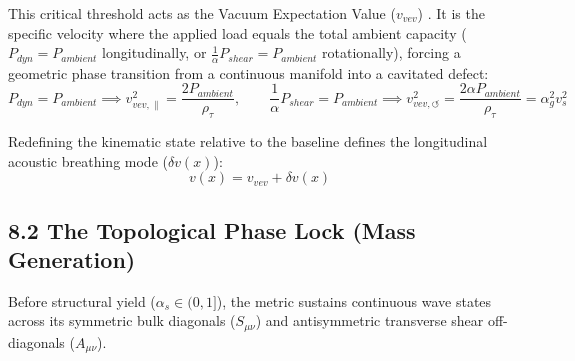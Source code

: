 This critical threshold acts as the Vacuum Expectation Value ($v_{vev}$) \cite{Volovik2003}. It is the specific velocity where the applied load equals the total ambient capacity ($P_{dyn} = P_{ambient}$ longitudinally, or $\frac{1}{\alpha}P_{shear} = P_{ambient}$ rotationally), forcing a geometric phase transition from a continuous manifold into a cavitated defect: %
\begin{equation}
    P_{dyn} = P_{ambient} \implies v_{vev,\parallel}^2 = \frac{2 P_{ambient}}{\rho_\tau}, \qquad \frac{1}{\alpha}P_{shear} = P_{ambient} \implies v_{vev,\circlearrowleft}^2 = \frac{2\alpha P_{ambient}}{\rho_\tau} = \alpha_g^2 v_s^2 \label{eq:tensor_vev} %
\end{equation}

Redefining the kinematic state relative to the baseline defines the longitudinal acoustic breathing mode ($\delta v(x)$): 
\begin{equation}
    v(x) = v_{vev} + \delta v(x)
\end{equation}



\subsection*{8.2 The Topological Phase Lock (Mass Generation)}
Before structural yield ($\alpha_s \in (0, 1]$), the metric sustains continuous wave states across its symmetric bulk diagonals ($S_{\mu\nu}$) and antisymmetric transverse shear off-diagonals ($A_{\mu\nu}$).

\vspace{0.2 cm}

